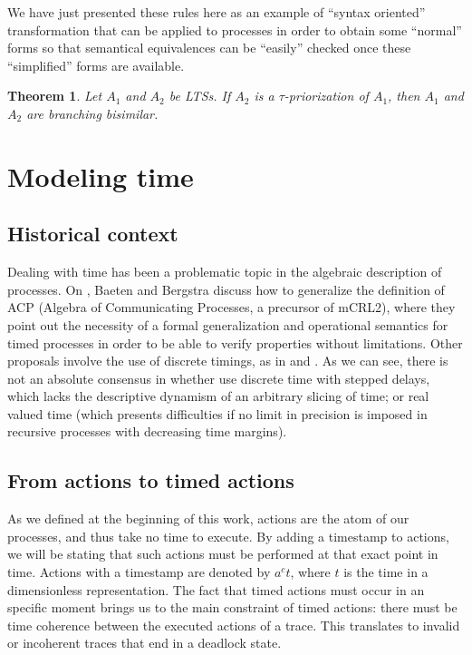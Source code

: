 \documentclass[11pt]{article}
\theoremstyle{definition}
\theoremstyle{plain}
\newtheorem{thm}{Theorem}[section]
\begin{document}
We have just presented these rules here as an example of ``syntax oriented'' transformation that can be applied to processes in order to obtain some ``normal'' forms so that semantical equivalences can be ``easily'' checked once these ``simplified'' forms are available.

\begin{thm}
	Let $ A_1 $ and $ A_2 $ be LTSs. If $ A_2 $ is a $ \tau $-priorization of $ A_1 $, then $ A_1 $ and $ A_2 $ are branching bisimilar.
\end{thm}

\section{Modeling time}

\subsection{Historical context}
Dealing with time has been a problematic topic in the algebraic description of processes. On \cite{Baeten1991}, Baeten and Bergstra discuss how to generalize the definition of ACP (Algebra of Communicating Processes, a precursor of mCRL2), where they point out the necessity of a formal generalization and operational semantics for timed processes in order to be able to verify properties without limitations. Other proposals involve the use of discrete timings, as in \cite{hennessy1995process} and \cite{baeten1996discrete}. As we can see, there is not an absolute consensus in whether use discrete time with stepped delays, which lacks the descriptive dynamism of an arbitrary slicing of time; or real valued time (which presents difficulties if no limit in precision is imposed in recursive processes with decreasing time margins).

\subsection{From actions to timed actions}

As we defined at the beginning of this work, actions are the atom of our processes, and thus take no time to execute. By adding a timestamp to actions, we will be stating that such actions must be performed at that exact point in time. Actions with a timestamp are denoted by $ a^c t $, where $ t $ is the time in a dimensionless representation. The fact that timed actions must occur in an specific moment brings us to the main constraint of timed actions: there must be time coherence between the executed actions of a trace. This translates to invalid or incoherent traces that end in a deadlock state.
\end{document}
